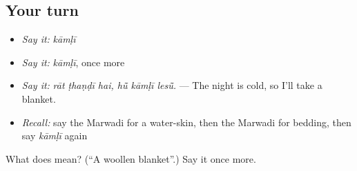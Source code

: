 \subsection*{Your turn}
\begin{itemize}
\raggedright
  \item \emph{Say it:} \emph{kāmḷī}
  \item \emph{Say it:} \emph{kāmḷī}, once more
  \item \emph{Say it:} \emph{rāt ṭhaṇḍī hai, hū̃ kāmḷī lesū̃.} — The night is cold, so I'll take a blanket.
  \item \emph{Recall:} say the Marwadi for a water-skin, then the Marwadi for bedding, then say \emph{kāmḷī} again
\end{itemize}

\begin{tcolorbox}[breakable,colback=teal!4,colframe=teal!35!black,title={Before you move on}]
What does  mean? (\textquotedblleft{}A woollen blanket\textquotedblright{}.) Say it once more.
\end{tcolorbox}
